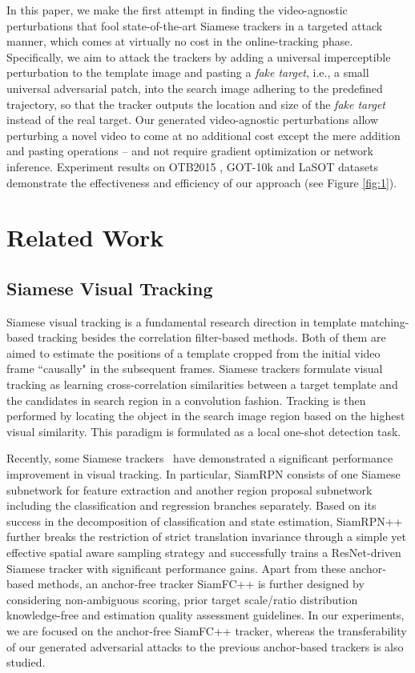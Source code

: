 \documentclass{article}
\newcommand{\ie}{i.e.}
\begin{document}
In this paper, we make the first attempt in finding the video-agnostic perturbations that fool state-of-the-art Siamese trackers in a targeted attack manner, which comes at virtually no cost in the online-tracking phase. Specifically, we aim to attack the trackers by adding a universal imperceptible perturbation to the template image and pasting a \textit{fake target}, \ie, a small universal adversarial patch, into the search image adhering to the predefined trajectory, so that the tracker outputs the location and size of the \textit{fake target} instead of the real target. Our generated video-agnostic perturbations allow perturbing a novel video to come at no additional cost except the mere addition and pasting operations -- and not require gradient optimization or network inference. Experiment results on OTB2015 \cite{OTB}, GOT-10k \cite{GOT-10k} and LaSOT \cite{GOT-10k} datasets demonstrate the effectiveness and efficiency of our approach (see Figure \ref{fig:1}).

\section{Related Work}

\subsection{Siamese Visual Tracking}

Siamese visual tracking is a fundamental research direction in template matching-based tracking besides the correlation filter-based methods. Both of them are aimed to estimate the positions of a template cropped from the initial video frame ``causally" in the subsequent frames. Siamese trackers formulate visual tracking as learning cross-correlation similarities between a target template and the candidates in search region in a convolution fashion. Tracking is then performed by locating the object in the search image region based on the highest visual similarity. This paradigm is formulated as a local one-shot detection task.

Recently, some Siamese trackers~\cite{SiamRPN,SiamRPN++,SiamFC++} have demonstrated a significant performance improvement in visual tracking. 
In particular, SiamRPN \cite{SiamRPN} consists of one Siamese subnetwork for feature extraction and another region proposal subnetwork including the classification and regression branches separately. Based on its success in the decomposition of classification and state estimation, SiamRPN++ \cite{SiamRPN++} further breaks the restriction of strict translation invariance through a simple yet effective spatial aware sampling strategy and successfully trains a ResNet-driven Siamese tracker with significant performance gains. Apart from these anchor-based methods, an anchor-free tracker SiamFC++ \cite{SiamFC++} is further designed by considering non-ambiguous scoring, prior target scale/ratio distribution knowledge-free and estimation quality assessment guidelines.
In our experiments, we are focused on the anchor-free SiamFC++ tracker, whereas the transferability of our generated adversarial attacks to the previous anchor-based trackers is also studied.
\end{document}
